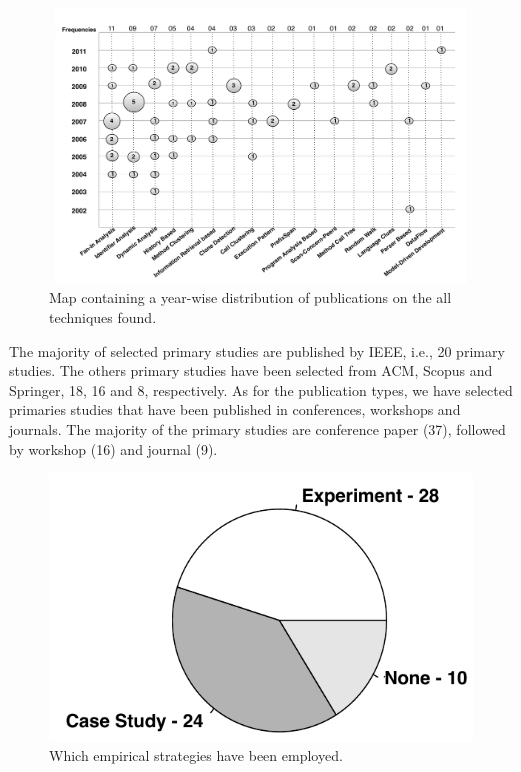 \begin{figure}
\centering
  \includegraphics[width=14.5cm, height=7.3cm]{figuras/MapaDasTecnicas}
\caption{Map containing a year-wise distribution of publications on the all techniques found.}
\label{map}
\end{figure} 

The majority of selected primary studies are published by IEEE, i.e., 20 primary studies. The others primary studies have been selected from ACM, Scopus and Springer, 18, 16 and 8, respectively. As for the publication types, we have selected primaries studies that have been published in conferences, workshops and journals. The majority of the primary studies are conference paper (37), followed by workshop (16) and journal (9).


\begin{figure}[!h]
\centering
  \includegraphics[scale=0.54]{figuras/pieChart}
\caption{Which empirical strategies have been employed.}
\label{empirical_strategies}
\end{figure} 


